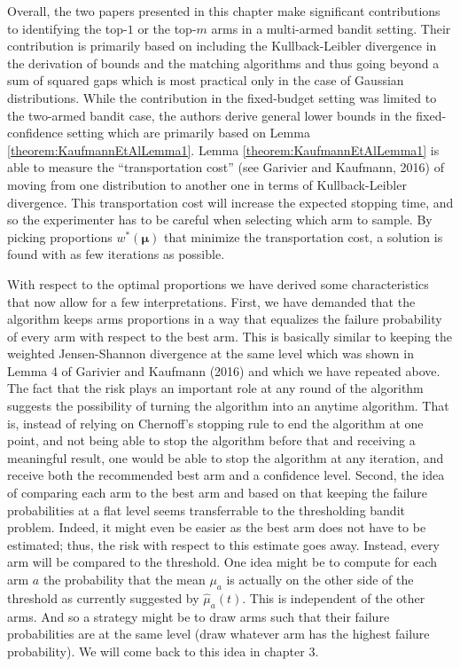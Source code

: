 \documentclass[12pt,]{article}
\begin{document}
Overall, the two papers presented in this chapter make significant
contributions to identifying the top-\(1\) or the top-\(m\) arms in a
multi-armed bandit setting. Their contribution is primarily based on
including the Kullback-Leibler divergence in the derivation of bounds
and the matching algorithms and thus going beyond a sum of squared gaps
which is most practical only in the case of Gaussian distributions.
While the contribution in the fixed-budget setting was limited to the
two-armed bandit case, the authors derive general lower bounds in the
fixed-confidence setting which are primarily based on Lemma
\ref{theorem:KaufmannEtAlLemma1}. Lemma \ref{theorem:KaufmannEtAlLemma1}
is able to measure the ``transportation cost'' (see Garivier and
Kaufmann, 2016) of moving from one distribution to another one in terms
of Kullback-Leibler divergence. This transportation cost will increase
the expected stopping time, and so the experimenter has to be careful
when selecting which arm to sample. By picking proportions
\(w^*(\bm{\mu})\) that minimize the transportation cost, a solution is
found with as few iterations as possible.

With respect to the optimal proportions we have derived some
characteristics that now allow for a few interpretations. First, we have
demanded that the algorithm keeps arms proportions in a way that
equalizes the failure probability of every arm with respect to the best
arm. This is basically similar to keeping the weighted Jensen-Shannon
divergence at the same level which was shown in Lemma 4 of Garivier and
Kaufmann (2016) and which we have repeated above. The fact that the risk
plays an important role at any round of the algorithm suggests the
possibility of turning the algorithm into an anytime algorithm. That is,
instead of relying on Chernoff's stopping rule to end the algorithm at
one point, and not being able to stop the algorithm before that and
receiving a meaningful result, one would be able to stop the algorithm
at any iteration, and receive both the recommended best arm and a
confidence level. Second, the idea of comparing each arm to the best arm
and based on that keeping the failure probabilities at a flat level
seems transferrable to the thresholding bandit problem. Indeed, it might
even be easier as the best arm does not have to be estimated; thus, the
risk with respect to this estimate goes away. Instead, every arm will be
compared to the threshold. One idea might be to compute for each arm
\(a\) the probability that the mean \(\mu_a\) is actually on the other
side of the threshold as currently suggested by \(\hat{\mu}_a(t)\). This
is independent of the other arms. And so a strategy might be to draw
arms such that their failure probabilities are at the same level (draw
whatever arm has the highest failure probability). We will come back to
this idea in chapter 3.
\end{document}
